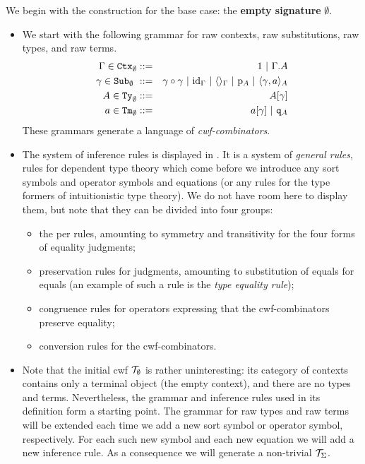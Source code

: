 \documentclass{lmcs}
\def\id{\mathrm{id}}
\begin{document}
We begin with the construction for the base case: the {\bf empty signature} $\emptyset$.
\begin{itemize}
\item
We start with the following grammar for raw contexts, raw substitutions, raw types, and raw terms.
\begin{eqnarray*}
\Gamma \in \RawCtx_\emptyset &::=& 1  \ |\ \Gamma\cext A\\
\gamma \in \RawSub_\emptyset  \ &::=& \gamma \circ \gamma \ |\ \id_\Gamma \ |\ \langle\rangle_\Gamma \ |\ \p_{A} \ |\ \langle \gamma, a \rangle_A\\
A \in \RawTy_\emptyset  &::=& A[\gamma]\\
a \in \RawTm_\emptyset  &::=& a[\gamma] \ |\ \qI_A
\end{eqnarray*}
These grammars generate a language of {\em cwf-combinators}.
\item
The system of inference rules is displayed in \cite{castellan:tlca2015,castellan:lmcs}. It is a system of {\em general rules}, rules for dependent type theory which come before we introduce any sort symbols and operator symbols and equations (or any rules for the type formers of intuitionistic type theory). We do not have room here to display them, but note that they can be divided into four groups:
\begin{itemize}
\item the per rules, amounting to symmetry and transitivity for the four forms of equality judgments;
\item preservation rules for judgments, amounting to substitution of equals for equals (an example of such a rule is the {\em type equality rule});
\item congruence rules for operators expressing that the cwf-combinators preserve equality;
\item conversion rules for the cwf-combinators.
\end{itemize}
\item
Note that the initial cwf ${\mathcal T}_\emptyset$ is rather uninteresting: its category of contexts contains only a terminal object (the empty context), and there are no types and terms. Nevertheless, the grammar and inference rules used in its definition form a starting point. The grammar for raw types and raw terms will be extended each time we add a new sort symbol or operator symbol, respectively. For each such new symbol and each new equation we will add a new inference rule. As a consequence we will generate a non-trivial ${\mathcal T}_\Sigma$.
\end{itemize}
\end{document}
